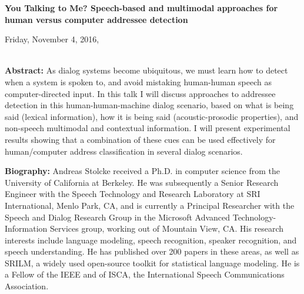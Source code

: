 \begin{center}
\textbf{\Large{}You Talking to Me? Speech-based and multimodal approaches for human versus computer addressee detection}{\Large{}\vspace{1em}
}
\par\end{center}{\Large \par}

\begin{center}
Friday, November 4, 2016,  \vspace{1em}
\\
 \PlenaryLoc \\
 \vspace{1em}

\par\end{center}

\noindent \textbf{Abstract:} 
 As dialog systems become ubiquitous, we must learn how to detect when a system is spoken to, and avoid mistaking human-human speech as computer-directed input. In this talk I will discuss approaches to addressee detection in this human-human-machine dialog scenario, based on what is being said (lexical information), how it is being said (acoustic-prosodic properties), and non-speech multimodal and contextual information. I will present experimental results showing that a combination of these cues can be used effectively for human/computer address classification in several dialog scenarios. 

\vspace{3em}

\vfill{}
\noindent \textbf{Biography:}  
 Andreas Stolcke received a Ph.D. in computer science from the University of California at Berkeley. He was subsequently a Senior Research Engineer with the Speech Technology and Research Laboratory at SRI International, Menlo Park, CA, and is currently a Principal Researcher with the Speech and Dialog Research Group in the Microsoft Advanced Technology-Information Services group, working out of Mountain View, CA. His research interests include language modeling, speech recognition, speaker recognition, and speech understanding. He has published over 200 papers in these areas, as well as SRILM, a widely used open-source toolkit for statistical language modeling. He is a Fellow of the IEEE and of ISCA, the International Speech Communications Association. 
\clearpage{}






